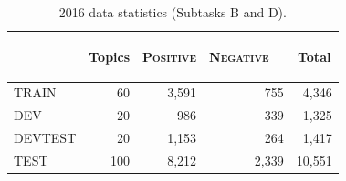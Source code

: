 \documentclass[11pt,letterpaper]{article}
\begin{document}
\begin{table}[th!]
  \small
  \begin{center}
    \resizebox{\columnwidth}{!} {
    \begin{tabular}{|l|r|rr|r|}
      \hline
      & \multicolumn{1}{c|}{\begin{sideways}\bf Topics\end{sideways}} & \multicolumn{1}{c}{\begin{sideways}\textsc{Positive}\end{sideways}} & \multicolumn{1}{c|}{\begin{sideways}\textsc{Negative~~}\end{sideways}} & \multicolumn{1}{c|}{\begin{sideways}\bf Total\end{sideways}}\\
      \hline
      TRAIN & 60 & 3,591 & 755 & 4,346 \\
      DEV & 20 & \phantom{0}986 & 339 & 1,325 \\
      DEVTEST & 20 & 1,153 & 264 & 1,417 \\
      TEST & 100 & 8,212 & 2,339 & 10,551\\
      \hline
    \end{tabular}
    }
    \caption{2016 data statistics (Subtasks B and D).}
    \label{T:CorpusStatsTopicBD}
  \end{center}
\end{table}
\end{document}
